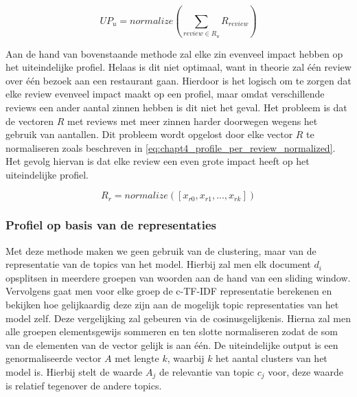 \begin{equation}
\label{eq:chapt4_profile_per_user}
    UP_{u} = normalize(\sum_{review \in R_u}R_{review})
\end{equation}

Aan de hand van bovenstaande methode zal elke zin evenveel impact hebben op het uiteindelijke profiel. Helaas is dit niet optimaal, want in theorie zal één review over één bezoek aan een restaurant gaan. Hierdoor is het logisch om te zorgen dat elke review evenveel impact maakt op een profiel, maar omdat verschillende reviews een ander aantal zinnen hebben is dit niet het geval. Het probleem is dat de vectoren $R$ met reviews met meer zinnen harder doorwegen wegens het gebruik van aantallen. Dit probleem wordt opgelost door elke vector $R$ te normaliseren zoals beschreven in \autoref{eq:chapt4_profile_per_review_normalized}. Het gevolg hiervan is dat elke review een even grote impact heeft op het uiteindelijke profiel.

\begin{equation}
\label{eq:chapt4_profile_per_review_normalized}
    R_r = normalize([x_{r0}, x_{r1}, ..., x_{rk}])
\end{equation}

\subsubsection{Profiel op basis van de representaties}

Met deze methode maken we geen gebruik van de clustering, maar van de representatie van de topics van het model. Hierbij zal men elk document $d_i$ opsplitsen in meerdere groepen van woorden aan de hand van een sliding window. Vervolgens gaat men voor elke groep de c-TF-IDF representatie berekenen en bekijken hoe gelijkaardig deze zijn aan de mogelijk topic representaties van het model zelf. Deze vergelijking zal gebeuren via de cosinusgelijkenis. Hierna zal men alle groepen elementsgewijs sommeren en ten slotte normaliseren zodat de som van de elementen van de vector gelijk is aan één. De uiteindelijke output is een genormaliseerde vector $A$ met lengte $k$, waarbij $k$ het aantal clusters van het model is. Hierbij stelt de waarde $A_j$ de relevantie van topic $c_j$ voor, deze waarde is relatief tegenover de andere topics.

